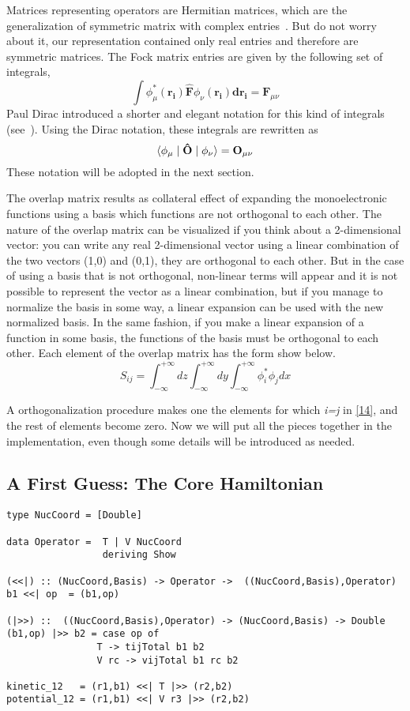 \documentclass{tmr}
\newcommand{\inftyint}{\int_{-\infty}^{+\infty}}
\begin{document}
\par Matrices representing operators are Hermitian matrices, which are the generalization
of symmetric matrix with complex entries~\cite{hermitian}. But do not worry about it, our representation
contained only real entries and therefore are symmetric matrices. The Fock matrix entries 
are given by the following set of integrals,
\[ \int{\phi^{*}_{\mu}(\mathbf{r_{i}}) \mathbf{\hat F} \phi_{\nu}(\mathbf{r_{i}}) \mathbf{dr_{i}}} =
 \mathbf{F}_{\mu \nu} \]
Paul Dirac introduced a shorter and elegant notation for 
this kind of integrals (see~\cite{bra-ket}). Using the Dirac notation, these integrals are rewritten as
\begin{equation}\label{14}
 \braket{\phi_{\mu} \mid \mathbf{\hat O} \mid  \phi_{\nu}}  = \mathbf{O}_{\mu \nu} 
\end{equation}
These notation will be adopted in the next section.

The overlap  matrix results as collateral effect of expanding the monoelectronic 
functions using a basis which functions are not orthogonal to each other. The nature 
of the overlap matrix can be visualized if you think about a 2-dimensional vector:
you can write any real 2-dimensional vector using a linear combination of the two
vectors (1,0) and (0,1), they are orthogonal to each other. But in the case 
of using a basis that is not orthogonal, non-linear terms will appear and 
it is not possible to represent the vector as a linear combination, 
but if you manage to normalize the basis in some way, a linear expansion can
be used with the new normalized basis. In the same fashion, if you make a linear expansion 
of a function in some basis, the functions of the basis must be orthogonal
to each other. Each element of the overlap matrix has the form show below.
\begin{equation}\label{15}
S_{ij} = \inftyint {dz \inftyint {dy \inftyint {\phi^{*}_{i} \phi_{j}dx}}} 
\end{equation}

A orthogonalization procedure makes one the elements for which \textit{i=j} in \eqref{14}, and
the rest of elements become zero. Now we will put all the pieces together in the implementation, 
even though some details will be introduced as needed.


\subsection{A First Guess: The Core Hamiltonian}
\begin{lstlisting}[float,captionpos=b,belowcaptionskip=4pt, caption= Operators definition]
type NucCoord = [Double]

data Operator =  T | V NucCoord
                 deriving Show

(<<|) :: (NucCoord,Basis) -> Operator ->  ((NucCoord,Basis),Operator)
b1 <<| op  = (b1,op)

(|>>) ::  ((NucCoord,Basis),Operator) -> (NucCoord,Basis) -> Double
(b1,op) |>> b2 = case op of
                T -> tijTotal b1 b2
                V rc -> vijTotal b1 rc b2

kinetic_12   = (r1,b1) <<| T |>> (r2,b2)
potential_12 = (r1,b1) <<| V r3 |>> (r2,b2)
\end{lstlisting}
\end{document}
